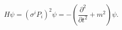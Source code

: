 \begin{equation}
\label{5}H\psi =\left( \sigma ^iP_i\right) ^2\psi =-\left( \frac{\partial ^2 
}{\partial t^2}+m^2\right) \psi . 
\end{equation}

